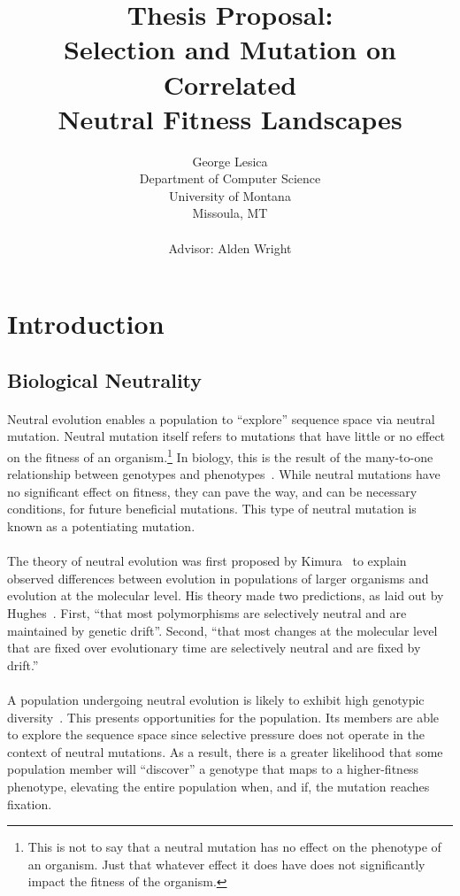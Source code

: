 \documentclass[12pt,letterpaper,titlepage]{article}
\title{Thesis Proposal:\\
Selection and Mutation on Correlated\\
Neutral Fitness Landscapes}
\author{George Lesica\\
Department of Computer Science\\
University of Montana\\
Missoula, MT\\
\\
Advisor: Alden Wright}
\begin{document}
\maketitle

\section{Introduction}

\subsection{Biological Neutrality}

\paragraph{}
Neutral evolution enables a population to ``explore'' sequence space via
neutral mutation. Neutral mutation itself refers to mutations that have little
or no effect on the fitness of an organism.\footnote{This is not to say that a
neutral mutation has no effect on the phenotype of an organism. Just that
whatever effect it does have does not significantly impact the fitness of the
organism.} In biology, this is the result of the many-to-one relationship
between genotypes and phenotypes~\cite{Newman1998}. While neutral mutations
have no significant effect on fitness, they can pave the way, and can be
necessary conditions, for future beneficial mutations. This type of neutral
mutation is known as a potentiating mutation.

\paragraph{}
The theory of neutral evolution was first proposed by Kimura~\cite{Kimura1984}
to explain observed differences between evolution in populations of larger
organisms and evolution at the molecular level. His theory made two
predictions, as laid out by Hughes~\cite{Hughes2007}. First, ``that most
polymorphisms are selectively neutral and are maintained by genetic drift''.
Second, ``that most changes at the molecular level that are fixed over
evolutionary time are selectively neutral and are fixed by drift.''

\paragraph{}
A population undergoing neutral evolution is likely to exhibit high genotypic
diversity~\cite{Huynen1996a}. This presents opportunities for the population.
Its members are able to explore the sequence space since selective pressure
does not operate in the context of neutral mutations. As a result, there is a
greater likelihood that some population member will ``discover'' a genotype
that maps to a higher-fitness phenotype, elevating the entire population when,
and if, the mutation reaches fixation.
\end{document}
